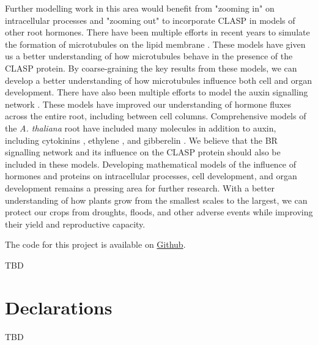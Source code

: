 \documentclass[referee,pdflatex,sn-mathphys-num]{sn-jnl}
\begin{document}
Further modelling work in this area would benefit from "zooming in" on intracellular processes and "zooming out" to incorporate CLASP in models of other root hormones. There have been multiple efforts in recent years to simulate the formation of microtubules on the lipid membrane \cite{tian2023, tindemans2014, allard2010a}. These models have given us a better understanding of how microtubules behave in the presence of the CLASP protein. By coarse-graining the key results from these models, we can develop a better understanding of how microtubules influence both cell and organ development. There have also been multiple efforts to model the auxin signalling network \cite{grieneisen2007, dimambro2017}. These models have improved our understanding of hormone fluxes across the entire root, including between cell columns. Comprehensive models of the \emph{A. thaliana} root have included many molecules in addition to auxin, including cytokinins \cite{salvi2020}, ethylene \cite{moore2024}, and gibberelin \cite{muraro2016}. We believe that the BR signalling network and its influence on the CLASP protein should also be included in these models. Developing mathematical models of the influence of hormones and proteins on intracellular processes, cell development, and organ development remains a pressing area for further research. With a better understanding of how plants grow from the smallest scales to the largest, we can protect our crops from droughts, floods, and other adverse events while improving their yield and reproductive capacity.

\backmatter


The code for this project is available on \href{https://github.com/rileywheadon/clasp-model}{Github}.


TBD

\section*{Declarations}

TBD


\end{document}
